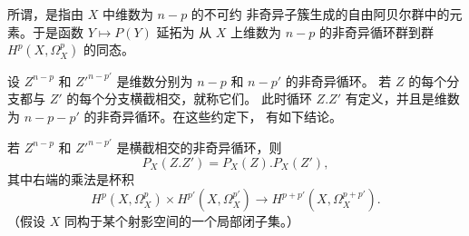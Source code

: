 所谓，是指由 $X$ 中维数为 $n-p$ 的不可约
非奇异子簇生成的自由阿贝尔群中的元素。于是函数 $Y\longmapsto P(Y)$ 延拓为
从 $X$ 上维数为 $n-p$ 的非奇异循环群到群 $H^{p}(X,\Omega_X^{p})$ 的同态。

设 $Z^{n-p}$ 和 $Z'^{n-p'}$ 是维数分别为 $n-p$ 和 $n-p'$ 的非奇异循环。
若 $Z$ 的每个分支都与 $Z'$ 的每个分支横截相交，就称它们。
此时循环 $Z.Z'$ 有定义，并且是维数为 $n-p-p'$ 的非奇异循环。在这些约定下，
有如下结论。

 若 $Z^{n-p}$ 和 $Z'^{n-p'}$ 是横截相交的非奇异循环，则
\begin{equation}\tag{4.4}
  P_X(Z.Z')=P_X(Z).P_X(Z'),
\end{equation}
其中右端的乘法是杯积
\[
  H^{p}(X,\Omega_X^{p})\times H^{p'}(X,\Omega_X^{p'})
  \longrightarrow H^{p+p'}(X,\Omega_X^{p+p'}).
\]
（假设 $X$ 同构于某个射影空间的一个局部闭子集。）

